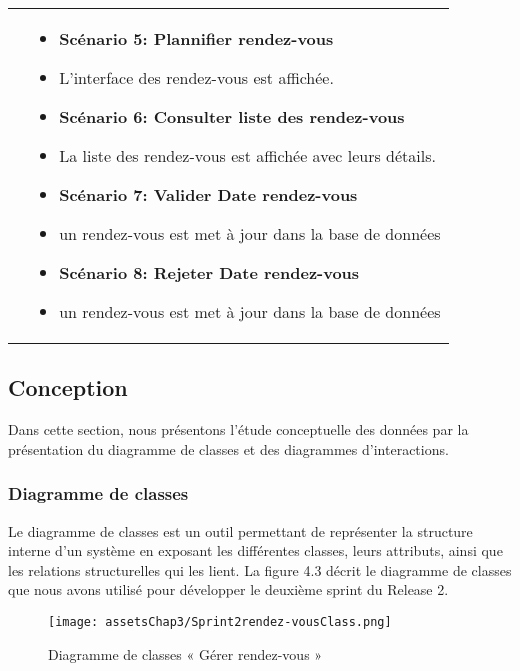 \begin{longtable}{|>{\arraybackslash}p{4.2cm}|>{\arraybackslash}p{12.5cm}|}
\hline
\textbf{}&
\begin{itemize}[label=]

\item\textbf{Scénario 5: Plannifier rendez-vous}
\item L'interface des rendez-vous est affichée.
\item\textbf{Scénario 6: Consulter liste des rendez-vous}
\item La liste des rendez-vous est affichée avec leurs détails.
\item\textbf{Scénario 7: Valider Date rendez-vous }
\item un rendez-vous est met à jour dans la base de données
\item\textbf{Scénario 8: Rejeter Date rendez-vous }
\item un rendez-vous est met à jour dans la base de données
\end{itemize}\\
\end{longtable}


\subsection{Conception}
Dans cette section, nous présentons l’étude conceptuelle des données par la présentation du
diagramme de classes et des diagrammes d’interactions.
\subsubsection{Diagramme de classes}
Le diagramme de classes est un outil permettant de représenter la structure interne d’un
système en exposant les différentes classes, leurs attributs, ainsi que les relations structurelles
qui les lient.
La figure 4.3 décrit le diagramme de classes que nous avons utilisé pour développer le deuxième
sprint du Release 2.
\begin{figure}[H]
\centering
\texttt{[image: assetsChap3/Sprint2rendez-vousClass.png]}
\caption{ Diagramme de classes « Gérer rendez-vous  » }
\end{figure}

